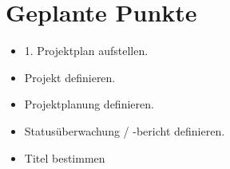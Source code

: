 \section{Geplante Punkte}


\begin{itemize}
  \item 1. Projektplan aufstellen.
  \item Projekt definieren.
  \item Projektplanung definieren.
  \item Statusüberwachung / -bericht definieren.
  \item Titel bestimmen
\end{itemize}

